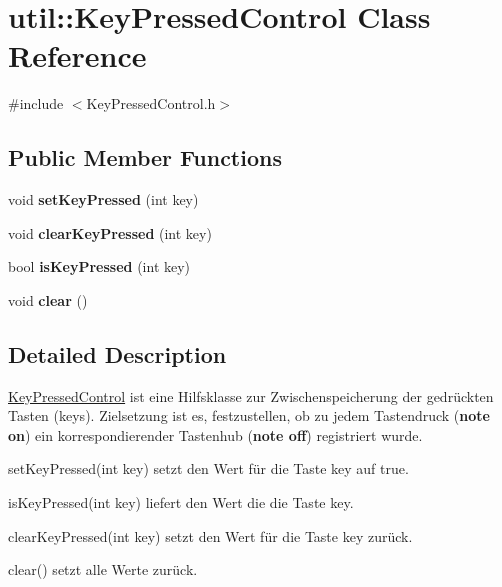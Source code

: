 \hypertarget{classutil_1_1KeyPressedControl}{}\section{util\+:\+:Key\+Pressed\+Control Class Reference}
\label{classutil_1_1KeyPressedControl}


{\ttfamily \#include $<$Key\+Pressed\+Control.\+h$>$}

\subsection*{Public Member Functions}
\begin{DoxyCompactItemize}
\item 
void {\bfseries set\+Key\+Pressed} (int key)\hypertarget{classutil_1_1KeyPressedControl_a0e465e30442619260ad7633883dac0a2}{}\label{classutil_1_1KeyPressedControl_a0e465e30442619260ad7633883dac0a2}

\item 
void {\bfseries clear\+Key\+Pressed} (int key)\hypertarget{classutil_1_1KeyPressedControl_ab4e421ccffed2708a2379d02a5d29766}{}\label{classutil_1_1KeyPressedControl_ab4e421ccffed2708a2379d02a5d29766}

\item 
bool {\bfseries is\+Key\+Pressed} (int key)\hypertarget{classutil_1_1KeyPressedControl_a5ae3665ad89b7d30ce5640eeb129bbcf}{}\label{classutil_1_1KeyPressedControl_a5ae3665ad89b7d30ce5640eeb129bbcf}

\item 
void {\bfseries clear} ()\hypertarget{classutil_1_1KeyPressedControl_ad80ff7c3e12d9647a04cb8960333bb30}{}\label{classutil_1_1KeyPressedControl_ad80ff7c3e12d9647a04cb8960333bb30}

\end{DoxyCompactItemize}


\subsection{Detailed Description}
\hyperlink{classutil_1_1KeyPressedControl}{Key\+Pressed\+Control} ist eine Hilfsklasse zur Zwischenspeicherung der gedrückten Tasten (keys). Zielsetzung ist es, festzustellen, ob zu jedem Tastendruck ({\bfseries note on}) ein korrespondierender Tastenhub ({\bfseries note off}) registriert wurde.


\begin{DoxyItemize}
\item set\+Key\+Pressed(int key) setzt den Wert für die Taste key auf true.
\item is\+Key\+Pressed(int key) liefert den Wert die die Taste key.
\item clear\+Key\+Pressed(int key) setzt den Wert für die Taste key zurück.
\item clear() setzt alle Werte zurück.
\end{DoxyItemize}

